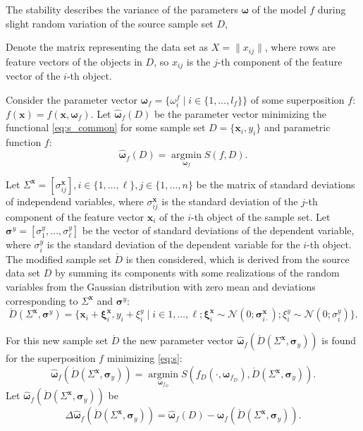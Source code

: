 \documentclass[11pt,a4paper]{article}
\theoremstyle{definition}
\begin{document}
The stability describes the variance of the parameters $\boldsymbol{\omega}$ of the model $f$
during slight random variation of the source sample set $D$,

Denote the matrix representing the data set as $X = \| x_{ij} \|$, where
rows are feature vectors of the objects in $D$, so $x_{ij}$
is the $j$-th component of the feature vector of the $i$-th object.

Consider the parameter vector
$\boldsymbol{\omega}_f = \{ \omega_i^f \mid i \in \{ 1, \dots, l_f \} \}$
of some superposition $f$: $f(\mathbf{x}) = f(\mathbf{x}, \boldsymbol{\omega}_f)$.
Let $\hat{\boldsymbol{\omega}}_f(D)$ be the parameter vector minimizing the
functional \eqref{eq:s_common} for some sample set $D = \{ \mathbf{x}_i, y_i \}$ and
parametric function $f$:
\[
  \hat{\boldsymbol{\omega}}_f(D) = \mathop{\arg \min}\limits_{\boldsymbol{\omega}_f} S(f, D).
\]

Let
$\Sigma^{\mathbf{x}} = [ \sigma^{\mathbf{x}}_{ij} ], i \in \{ 1, \dots, \ell \}, j \in \{ 1, \dots, n \}$
be the matrix of
standard deviations of independend variables, where $\sigma^{\mathbf{x}}_{ij}$
is the standard deviation of the $j$-th component of the feature vector
$\mathbf{x}_i$ of the $i$-th object of the sample set. Let
$\boldsymbol{\sigma}^y = [ \sigma^y_1, \dots, \sigma^y_\ell ]$
be the vector of standard deviations of the dependent variable, where $\sigma^y_i$
is the standard deviation of the dependent variable for the $i$-th object.
The modified sample set $\acute{D}$ is then considered, which is derived from the
source data set $D$ by summing its components with some realizations of the
random variables from the Gaussian distribution with zero mean and 
deviations corresponding to $\Sigma^{\mathbf{x}}$ and $\boldsymbol{\sigma}^y$:
\begin{equation}
  \acute{D}(\Sigma^{\mathbf{x}}, \boldsymbol{\sigma}^y) = \{ \mathbf{x}_i + \boldsymbol{\xi}^{\mathbf{x}}_i, y_i + \xi^y_i \mid i \in 1, \dots, \ell; \boldsymbol{\xi}^{\mathbf{x}}_i \sim \mathcal{N}(0; \boldsymbol{\sigma}^{\mathbf{x}}_{i \cdot}); \xi^y_i \sim \mathcal{N}(0; \sigma^y_i) \}.
  \label{eq:d_acute}
\end{equation}

For this new sample set $\acute{D}$ the new parameter vector $\hat{\boldsymbol{\omega}}_f (\acute{D} (\Sigma^{\mathbf{x}}, \boldsymbol{\sigma}_y))$
is found for the superposition $f$ minimizing \eqref{eq:s}:
\begin{equation}
  \hat{\boldsymbol{\omega}}_f (\acute{D} (\Sigma^{\mathbf{x}}, \boldsymbol{\sigma}_y)) = \mathop{\arg \min}\limits_{\boldsymbol{\omega}_{f_D}} S (f_D (\cdot, \boldsymbol{\omega}_{f_D}), \acute{D} (\Sigma^{\mathbf{x}}, \boldsymbol{\sigma}_y)).
  \label{eq:hat_omega}
\end{equation}
Let $\hat{\boldsymbol{\omega}}_f (\acute{D} (\Sigma^{\mathbf{x}}, \boldsymbol{\sigma}_y))$ be
\[
  \Delta\hat{\boldsymbol{\omega}}_f(\acute{D} (\Sigma^{\mathbf{x}}, \boldsymbol{\sigma}_y) ) = \hat{\boldsymbol{\omega}}_f(D) - \hat{\boldsymbol{\omega}}_f (\acute{D} (\Sigma^{\mathbf{x}}, \boldsymbol{\sigma}_y)).
\]
\end{document}
